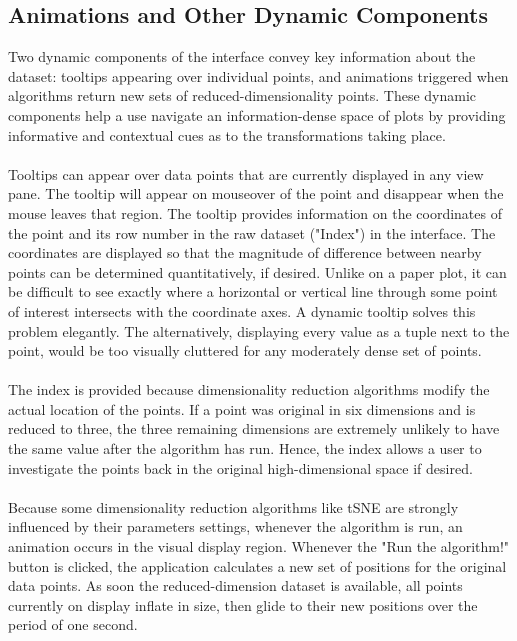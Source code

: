 \documentclass{sigchi}
\begin{document}
\subsection{Animations and Other Dynamic Components}
%
Two dynamic components of the interface convey key information about the dataset: tooltips appearing over individual points, and animations triggered when algorithms return new sets of reduced-dimensionality points. %
%
These dynamic components help a use navigate an information-dense space of plots by providing informative and contextual cues as to the transformations taking place. %
%
\\\\
%
Tooltips can appear over data points that are currently displayed in any view pane. %
%
The tooltip will appear on mouseover of the point and disappear when the mouse leaves that region. %
%
The tooltip provides information on the coordinates of the point and its row number in the raw dataset ("Index") in the interface. %
%
The coordinates are displayed so that the magnitude of difference between nearby points can be determined quantitatively, if desired. %
%
Unlike on a paper plot, it can be difficult to see exactly where a horizontal or vertical line through some point of interest intersects with the coordinate axes. %
%
A dynamic tooltip solves this problem elegantly.
%
The alternatively, displaying every value as a tuple next to the point, would be too visually cluttered for any moderately dense set of points. %
%
\\\\
%
The index is provided because dimensionality reduction algorithms modify the actual location of the points. %
%
If a point was original in six dimensions and is reduced to three, the three remaining dimensions are extremely unlikely to have the same value after the algorithm has run. %
%
Hence, the index allows a user to investigate the points back in the original high-dimensional space if desired. %
\\\\
%
Because some dimensionality reduction algorithms like tSNE are strongly influenced by their parameters settings, whenever the algorithm is run, an animation occurs in the visual display region. %
%
Whenever the "Run the algorithm!" button is clicked, the application calculates a new set of positions for the original data points. %
%
As soon the reduced-dimension dataset is available, all points currently on display inflate in size, then glide to their new positions over the period of one second.
\end{document}

